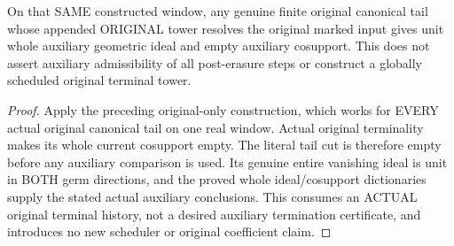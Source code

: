 \begin{theorem}
\label{hir:original-terminal-canonical-tail-fixed-reference-unit-ideal}
\leanok
{}
On that SAME constructed window, any genuine finite original canonical tail
whose appended ORIGINAL tower resolves the original marked input gives
unit whole auxiliary geometric ideal and empty auxiliary cosupport.
This does not assert auxiliary admissibility of all post-erasure steps or
construct a globally scheduled original terminal tower.
\end{theorem}
\begin{proof}
Apply the preceding original-only construction, which works for EVERY actual
original canonical tail on one real window. Actual original terminality
makes its whole current cosupport empty. The literal tail cut is therefore
empty before any auxiliary comparison is used. Its genuine entire vanishing
ideal is unit in BOTH germ directions, and the proved whole ideal/cosupport
dictionaries supply the stated actual auxiliary conclusions. This consumes
an ACTUAL original terminal history, not a desired auxiliary termination
certificate, and introduces no new scheduler or original coefficient claim.
\end{proof}
